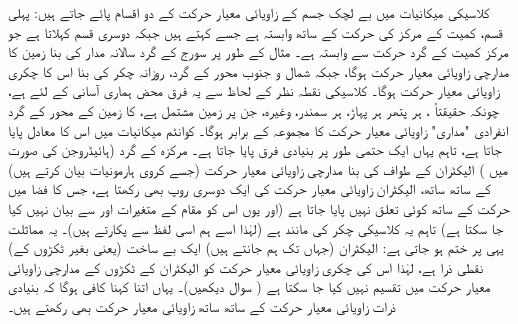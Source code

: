 کلاسیکی میکانیات میں بے لچک جسم کے زاویائی معیار حرکت کے دو اقسام پائے جاتے ہیں:  پہلی قسم،   کمیت کے مرکز کی  حرکت کے ساتھ وابستہ ہے جسے     کہتے ہیں جبکہ دوسری  قسم     کہلاتا ہے  جو مرکز کمیت کے گرد حرکت سے وابستہ ہے۔ مثال کے طور پر سورج کے گرد سالانہ مدار کی بنا زمین کا مدارچی زاویائی معیار حرکت ہوگا، جبکہ شمال و  جنوب محور کے گرد، روزانہ چکر کی بنا اس کا چکری زاویائی معیار حرکت ہوگا۔  کلاسیکی  نقطہ نظر کے لحاظ سے  یہ فرق  محض ہماری آسانی کے لئے ہے،  چونکہ حقیقتاً ،  ہر پتھر ہر پہاڑ، ہر سمندر،  وغیرہ،  جن پر زمین مشتمل ہے،  کا زمین کے محور کے گرد انفرادی "مداری" زاویائی معیار حرکت کا مجموعہ   کے برابر ہوگا۔  کوانٹم میکانیات میں اس کا معادل پایا جاتا ہے، تاہم  یہاں ایک حتمی  طور پر  بنیادی فرق پایا جاتا ہے۔ مرکزہ کے گرد  (ہائیڈروجن کی صورت میں )  الیکٹران کے  طواف کی بنا مدارچی زاویائی معیار حرکت (جسے کروی ہارمونیات بیان کرتے ہیں) کے ساتھ ساتھ،  الیکٹران زاویائی معیار حرکت کی ایک دوسری روپ بھی رکھتا ہے، جس کا فضا میں حرکت کے ساتھ کوئی تعلق نہیں پایا جاتا ہے (اور یوں  اس کو مقام کے متغیرات   اور  سے بیان نہیں کیا جا سکتا ہے) تاہم   یہ کلاسیکی چکر کی مانند ہے (لہٰذا اسے ہم اسی لفظ سے پکارتے ہیں)۔  یہ مماثلت یہی پر ختم ہو جاتی ہے:   الیکٹران (جہاں تک ہم جانتے ہیں) ایک   بے ساخت (یعنی بغیر ٹکڑوں کے)   نقطی ذرا ہے،  لہٰذا اس کی چکری زاویائی معیار حرکت کو الیکٹران  کے ٹکڑوں کے  مدارچی زاویائی معیار حرکت   میں تقسیم نہیں کیا  جا سکتا ہے ( سوال  دیکھیں)۔   یہاں اتنا کہنا کافی ہوگا کہ بنیادی ذرات    زاویائی معیار حرکت  کے ساتھ ساتھ     زاویائی معیار حرکت  بھی رکھتے ہیں۔

